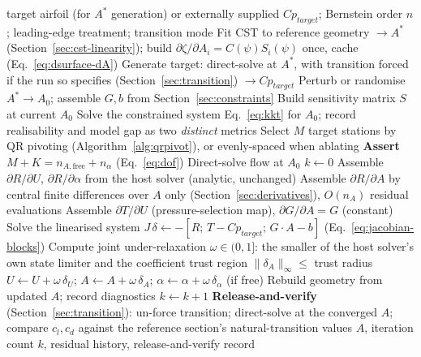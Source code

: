 \begin{algorithm}
\caption{Monolithic CST--Newton inverse iteration}
\label{alg:monolithic}
\begin{algorithmic}[1]
\Require target airfoil (for $A^\ast$ generation) or externally supplied $Cp_{target}$; Bernstein order $n$; leading-edge treatment; transition mode
\State Fit CST to reference geometry $\rightarrow A^\ast$ (Section~\ref{sec:cst-linearity}); build $\partial\zeta/\partial A_i = C(\psi)S_i(\psi)$ once, cache (Eq.~\eqref{eq:dsurface-dA})
\State Generate target: direct-solve at $A^\ast$, with transition forced if the run so specifies (Section~\ref{sec:transition}) $\rightarrow Cp_{target}$
\State Perturb or randomise $A^\ast \rightarrow A_0$; assemble $G,b$ from Section~\ref{sec:constraints}
   
    \State Build sensitivity matrix $S$ at current $A_0$
    \State Solve the constrained system Eq.~\eqref{eq:kkt} for $A_0$; record realisability and model gap as two \emph{distinct} metrics
  \EndFor
\EndIf
\State Select $M$ target stations by QR pivoting (Algorithm~\ref{alg:qrpivot}), or evenly-spaced when ablating
\State \textbf{Assert} $M+K=n_{A,\text{free}}+n_\alpha$ (Eq.~\eqref{eq:dof}) 
\State Direct-solve flow at $A_0$ 
\State $k \gets 0$
 
  \State Assemble $\partial R/\partial U$, $\partial R/\partial\alpha$ from the host solver (analytic, unchanged)
  \State Assemble $\partial R/\partial A$ by central finite differences over $A$ only (Section~\ref{sec:derivatives}), $O(n_A)$ residual evaluations
  \State Assemble $\partial T/\partial U$ (pressure-selection map), $\partial G/\partial A = G$ (constant)
  \State Solve the linearised system $J\,\delta \gets -[R;\,T-Cp_{target};\,G\cdot A-b]$ (Eq.~\eqref{eq:jacobian-blocks})
  \State Compute joint under-relaxation $\omega\in(0,1]$: the smaller of the host solver's own state limiter and the coefficient trust region $\|\delta_A\|_\infty \leq$ trust radius
  \State $U \gets U + \omega\,\delta_U$; $A \gets A + \omega\,\delta_A$; $\alpha \gets \alpha + \omega\,\delta_\alpha$ (if free)
  \State Rebuild geometry from updated $A$; record diagnostics
  \State $k \gets k+1$
\EndWhile
\State \textbf{Release-and-verify} (Section~\ref{sec:transition}): un-force transition; direct-solve at the converged $A$; compare $c_l, c_d$ against the reference section's natural-transition values
\State \Return $A$, iteration count $k$, residual history, release-and-verify record
\end{algorithmic}
\end{algorithm}

